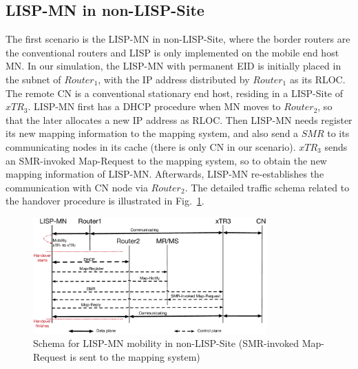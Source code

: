\subsection{LISP-MN in non-LISP-Site}
\label{sec:ns3_analysis_lispmn}
The first scenario is the LISP-MN in non-LISP-Site, where the border routers are the conventional routers and LISP is only implemented on the mobile end host MN. In our simulation, the LISP-MN with permanent EID is initially placed in the subnet of $Router_1$, with the IP address distributed by $Router_1$ as its RLOC. The remote CN is a conventional stationary end host, residing in a LISP-Site of $xTR_3$. %
LISP-MN first has a DHCP procedure when MN moves to $Router_2$, so that the later allocates a new IP address as RLOC. Then LISP-MN needs register its new mapping information to the mapping system, and also send a $SMR$ to its communicating nodes in its cache (there is only CN in our scenario). $xTR_3$ sends an SMR-invoked Map-Request to the mapping system, so to obtain the new mapping information of LISP-MN. Afterwards, LISP-MN re-establishes  the communication with CN node via $Router_2$. The detailed traffic schema related to the handover procedure is illustrated in Fig.~\ref{sim_schema_LISPMN}.  %
\begin{figure}[!t]
	\centering
	\includegraphics[width=0.8\textwidth]{Pics/Mobility_LISPMN_schema_SMR_simplify}
	\caption{Schema for LISP-MN mobility in non-LISP-Site (SMR-invoked Map-Request is sent to the mapping system)}
	\label{sim_schema_LISPMN}
\end{figure}

